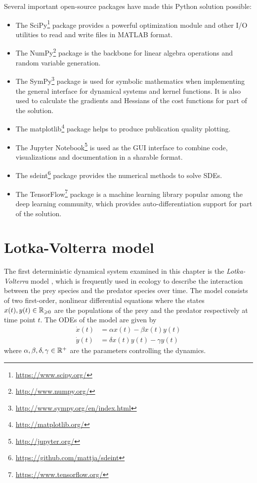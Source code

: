 Several important open-source packages have made this Python solution possible:
\begin{itemize}
    \item The SciPy\footnote{\url{https://www.scipy.org/}} package provides a powerful optimization module and other I/O utilities to read and write files in MATLAB format.
    \item The NumPy\footnote{\url{http://www.numpy.org/}} package is the backbone for linear algebra operations and random variable generation.
    \item The SymPy\footnote{\url{http://www.sympy.org/en/index.html}} package is used for symbolic mathematics when implementing the general interface for dynamical systems and kernel functions. It is also used to calculate the gradients and Hessians of the cost functions for part of the solution.
    \item The matplotlib\footnote{\url{http://matplotlib.org/}} package helps to produce publication quality plotting.
    \item The Jupyter Notebook\footnote{\url{http://jupyter.org/}} is used as the GUI interface to combine code, visualizations and documentation in a sharable format.
    \item The sdeint\footnote{\url{https://github.com/mattja/sdeint}} package provides the numerical methods to solve SDEs. 
    \item The TensorFlow\footnote{\url{https://www.tensorflow.org/}} package is a machine learning library popular among the deep learning community, which provides auto-differentiation support for part of the solution.
\end{itemize}


\section{Lotka-Volterra model}
\label{sec-lotka-volterra}

The first deterministic dynamical system examined in this chapter is the \emph{Lotka-Volterra} model \citep{lotka1932growth}, which is frequently used in ecology to describe the interaction between the prey species and the predator species over time.
The model consists of two first-order, nonlinear differential equations where the states $x(t), y(t)\in \mathbb{R}_{\geqslant 0}$ are the populations of the prey and the predator respectively at time point $t$.
The ODEs of the model are given by
\begin{align}
    \dot{x}(t) & = \alpha x(t) - \beta x(t)y(t)
    \nonumber
    \\
    \dot{y}(t) & = \delta x(t)y(t) - \gamma y(t)
    \label{eq-lotka-odes}
\end{align}
where $\alpha, \beta, \delta, \gamma \in \mathbb{R}^+$ are the parameters controlling the dynamics.
 

